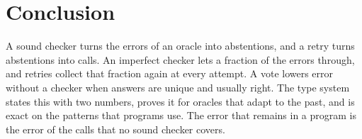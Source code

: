 \documentclass[acmsmall,nonacm,screen]{acmart}
\begin{document}
\section{Conclusion}

A sound checker turns the errors of an oracle into abstentions, and a retry turns abstentions
into calls. An imperfect checker lets a fraction of the errors through, and retries collect
that fraction again at every attempt. A vote lowers error without a checker when answers are
unique and usually right. The type system states this with two numbers, proves it for
oracles that adapt to the past, and is exact on the patterns that programs use. The error
that remains in a program is the error of the calls that no sound checker covers.



\end{document}

